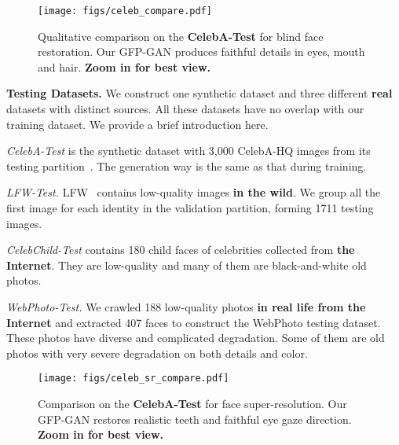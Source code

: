 \documentclass[final]{cvpr}
\begin{document}
\begin{figure*}
	\vspace{-0.8cm}
	\begin{center}
\texttt{[image: figs/celeb\_compare.pdf]}
	\end{center}
	\vspace{-0.8cm}
	\caption{Qualitative comparison on the \textbf{CelebA-Test} for blind face restoration. Our GFP-GAN produces faithful details in eyes, mouth and hair. \textbf{Zoom in for best view.}}
	\label{fig:celeb_compare}
	\vspace{-0.1cm}
\end{figure*}

\noindent\textbf{Testing Datasets.}
We construct one synthetic dataset and three different \textbf{real} datasets with distinct sources. All these datasets have no overlap with our training dataset.
We provide a brief introduction here. 

 \textit{CelebA-Test} is the synthetic dataset with 3,000 CelebA-HQ images from its testing partition~\cite{liu2015faceattributes}. The generation way is the same as that during training.

 \textit{LFW-Test.} LFW~\cite{LFWTech} contains low-quality images \textbf{in the wild}. We group all the first image for each identity in the validation partition, forming 1711 testing images.

 \textit{CelebChild-Test} contains 180 child faces of celebrities collected from \textbf{the Internet}. They are low-quality and many of them are black-and-white old photos.

 \textit{WebPhoto-Test.} We crawled 188 low-quality photos \textbf{in real life from the Internet} and extracted 407 faces to construct the WebPhoto testing dataset. These photos have diverse and complicated degradation. Some of them are old photos with very severe degradation on both details and color.

\begin{figure}[]
	\begin{center}
\texttt{[image: figs/celeb\_sr\_compare.pdf]}
	\end{center}
	\vspace{-0.8cm}
	\caption{Comparison on the \textbf{CelebA-Test} for  face super-resolution. Our GFP-GAN restores realistic teeth and faithful eye gaze direction. \textbf{Zoom in for best view.}}
	\label{fig:celeb_sr_compare}
	\vspace{-0.5cm}
\end{figure}
\end{document}

